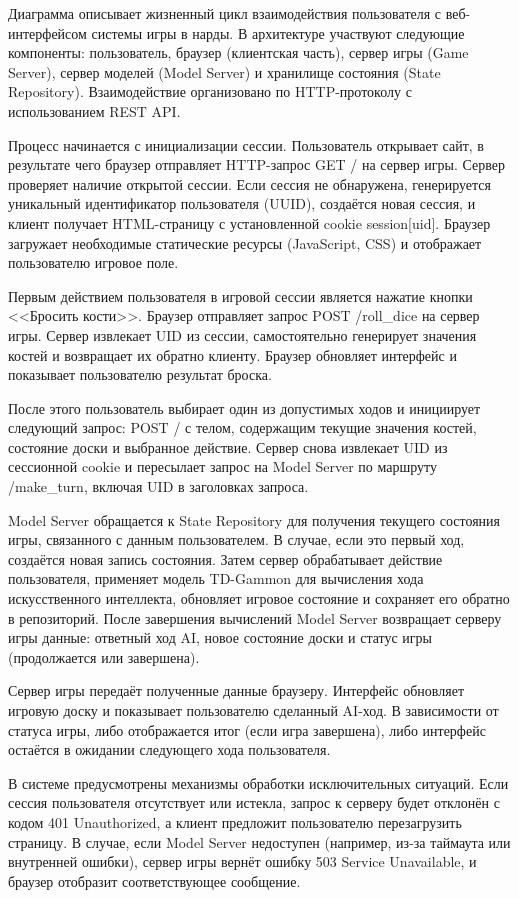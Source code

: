 Диаграмма  описывает жизненный цикл взаимодействия пользователя с веб-интерфейсом системы игры в нарды. В архитектуре участвуют следующие компоненты: пользователь, браузер (клиентская часть), сервер игры (Game Server), сервер моделей (Model Server) и хранилище состояния (State Repository). Взаимодействие организовано по HTTP-протоколу с использованием REST API.


Процесс начинается с инициализации сессии. Пользователь открывает сайт, в результате чего браузер отправляет HTTP-запрос GET / на сервер игры. Сервер проверяет наличие открытой сессии. Если сессия не обнаружена, генерируется уникальный идентификатор пользователя (UUID), создаётся новая сессия, и клиент получает HTML-страницу с установленной cookie session[uid]. Браузер загружает необходимые статические ресурсы (JavaScript, CSS) и отображает пользователю игровое поле.

Первым действием пользователя в игровой сессии является нажатие кнопки <<Бросить кости>>. Браузер отправляет запрос POST /roll\_dice на сервер игры. Сервер извлекает UID из сессии, самостоятельно генерирует значения костей и возвращает их обратно клиенту. Браузер обновляет интерфейс и показывает пользователю результат броска.

После этого пользователь выбирает один из допустимых ходов и инициирует следующий запрос: POST / с телом, содержащим текущие значения костей, состояние доски и выбранное действие. Сервер снова извлекает UID из сессионной cookie и пересылает запрос на Model Server по маршруту /make\_turn, включая UID в заголовках запроса.

Model Server обращается к State Repository для получения текущего состояния игры, связанного с данным пользователем. В случае, если это первый ход, создаётся новая запись состояния. Затем сервер обрабатывает действие пользователя, применяет модель TD-Gammon для вычисления хода искусственного интеллекта, обновляет игровое состояние и сохраняет его обратно в репозиторий. После завершения вычислений Model Server возвращает серверу игры данные: ответный ход AI, новое состояние доски и статус игры (продолжается или завершена).

Сервер игры передаёт полученные данные браузеру. Интерфейс обновляет игровую доску и показывает пользователю сделанный AI-ход. В зависимости от статуса игры, либо отображается итог (если игра завершена), либо интерфейс остаётся в ожидании следующего хода пользователя.

В системе предусмотрены механизмы обработки исключительных ситуаций. Если сессия пользователя отсутствует или истекла, запрос к серверу будет отклонён с кодом 401 Unauthorized, а клиент предложит пользователю перезагрузить страницу. В случае, если Model Server недоступен (например, из-за таймаута или внутренней ошибки), сервер игры вернёт ошибку 503 Service Unavailable, и браузер отобразит соответствующее сообщение.
